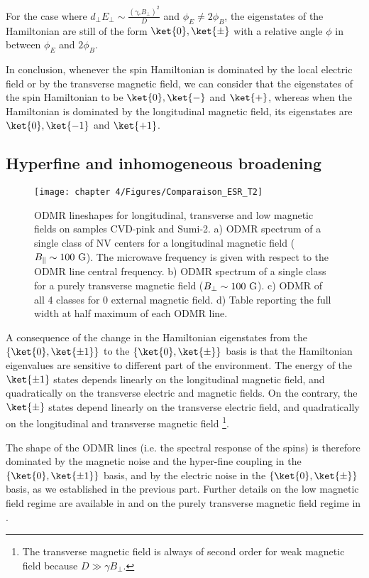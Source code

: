 \documentclass[a4paper, 11pt]{report}
\begin{document}
For the case where $d_\perp E_\perp \sim \frac{(\gamma_e B_\perp)^2}{D}$ and $\phi_E \neq 2\phi_B$, the eigenstates of the Hamiltonian are still of the form $\ket{0},\ket{\pm}$ with a relative angle $\phi$ in between $\phi_E$ and $2\phi_B$.

In conclusion, whenever the spin Hamiltonian is dominated by the local electric field or by the transverse magnetic field, we can consider that the eigenstates of the spin Hamiltonian to be $\ket{0}, \ket{-}$ and $\ket{+}$, whereas when the Hamiltonian is dominated by the longitudinal magnetic field, its eigenstates are $\ket{0}, \ket{-1}$ and $\ket{+1}$.

\subsection{Hyperfine and inhomogeneous broadening}
\label{sec modif T2*}
\begin{figure}[h]
\centering
\texttt{[image: chapter 4/Figures/Comparaison\_ESR\_T2]}
\caption{ODMR lineshapes for longitudinal, transverse and low magnetic fields on samples CVD-pink and Sumi-2. a) ODMR spectrum of a single class of NV centers for a longitudinal magnetic field ($B_\parallel \sim 100\ \rm G$). The microwave frequency is given with respect to the ODMR line central frequency. b) ODMR spectrum of a single class for a purely transverse magnetic field ($B_\perp \sim 100\ \rm G$). c) ODMR of all 4 classes for 0 external magnetic field. d) Table reporting the full width at half maximum of each ODMR line.}
\label{ESR for T2*}
\end{figure}

A consequence of the change in the Hamiltonian eigenstates from the $\{ \ket{0}, \ket{\pm 1} \}$ to the $\{ \ket{0}, \ket{\pm} \}$ basis is that the Hamiltonian eigenvalues are sensitive to different part of the environment. The energy of the $\ket{\pm 1}$ states depends linearly on the longitudinal magnetic field, and quadratically on the transverse electric and magnetic fields. On the contrary, the $\ket{\pm}$ states depend linearly on the transverse electric field, and quadratically on the longitudinal and transverse magnetic field \footnote{The transverse magnetic field is always of second order for weak magnetic field because $D\gg \gamma B_\perp$.}. 

The shape of the ODMR lines (i.e. the spectral response of the spins) is therefore dominated by the magnetic noise and the hyper-fine coupling in the $\{ \ket{0}, \ket{\pm 1} \}$ basis, and by the electric noise in the $\{ \ket{0}, \ket{\pm} \}$ basis, as we established in the previous part. Further details on the low magnetic field regime are available in \citep{jamonneau2016competition} and on the purely transverse magnetic field regime in \citep{qiu2021nuclear, qiu2022nanoscale}.
\end{document}
